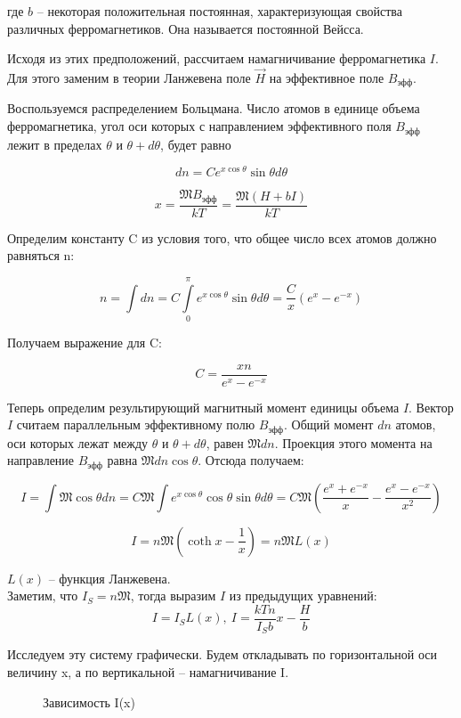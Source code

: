 \documentclass[a4paper,14pt]{article} %
\begin{document}
где $b$ -- некоторая положительная постоянная, характеризующая свойства различных ферромагнетиков. Она называется постоянной Вейсса.

Исходя из этих предположений, рассчитаем намагничивание ферромагнетика $I$. Для этого заменим в теории Ланжевена поле $\overrightarrow{H}$ на эффективное поле $B_\text{эфф}$.

Воспользуемся распределением Больцмана. Число атомов в единице объема ферромагнетика, угол оси которых с направлением эффективного поля $B_\text{эфф}$ лежит в пределах $\theta$ и $\theta +d\theta$, будет равно 

\[dn = C e^{x\cos{\theta}}\sin{\theta d\theta}\]

\[x = \frac{\mathfrak{M}B_\text{эфф}}{kT} = \frac{\mathfrak{M}(H + bI)}{kT}\]

Определим константу C из условия того, что общее число всех атомов должно равняться n:

\[n = \int{dn} = C\int\limits_{0}^{\pi}{e^{x\cos{\theta}}\sin{\theta d\theta}} = \frac{C}{x}(e^x - e^{-x})\]

Получаем выражение для C:

\[C = \frac{xn}{e^x-e^{-x}}\]

Теперь определим результирующий магнитный момент единицы объема $I$. Вектор $I$ считаем параллельным эффективному полю $B_\text{эфф}$. Общий момент $dn$ атомов, оси которых лежат между $\theta$ и $\theta + d\theta$, равен $\mathfrak{M}dn$. Проекция этого момента на направление $B_\text{эфф}$ равна $\mathfrak{M}dn\cos{\theta}$. Отсюда получаем:

\[I = \int{\mathfrak{M}\cos{\theta}dn} = C\mathfrak{M}\int{e^{x\cos{\theta}}\cos{\theta}\sin{\theta} d\theta} = C\mathfrak{M}\left(\frac{e^x + e^{-x}}{x} - \frac{e^x-e^{-x}}{x^2}\right)\]

\[I = n\mathfrak{M}\left(\coth{x} - \frac{1}{x}\right) = n\mathfrak{M}L(x)\]

$L(x)$ -- функция Ланжевена.\\
Заметим, что $I_S = n\mathfrak{M}$, тогда выразим $I$ из предыдущих уравнений:
\[I = I_S L(x), ~I = \frac{kTn}{I_S b}x - \frac{H}{b}\]

Исследуем эту систему графически. Будем откладывать по горизонтальной оси величину x, а по вертикальной -- намагничивание I.

\begin{figure}[H]
	\caption{Зависимость I(x)}
\end{figure}
\end{document}
